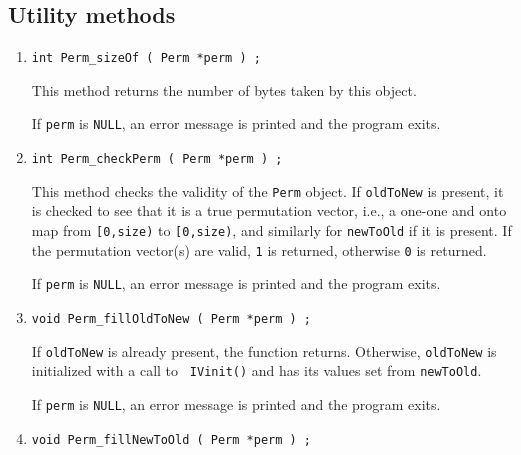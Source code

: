 \subsection{Utility methods}
\label{subsection:Perm:proto:utilities}
\par
\begin{enumerate}
\item
\begin{verbatim}
int Perm_sizeOf ( Perm *perm ) ;
\end{verbatim}
This method returns the number of bytes taken by this object.
\par {}
If {\tt perm} is {\tt NULL}, 
an error message is printed and the program exits.
\item
\begin{verbatim}
int Perm_checkPerm ( Perm *perm ) ;
\end{verbatim}
This method checks the validity of the {\tt Perm} object.
If {\tt oldToNew} is present, it is checked to see that
it is a true permutation vector, i.e., a one-one and onto map from
{\tt [0,size)} to {\tt [0,size)}, and similarly for {\tt newToOld}
if it is present.
If the permutation vector(s) are valid, {\tt 1} is returned,
otherwise {\tt 0} is returned.
\par {}
If {\tt perm} is {\tt NULL}, 
an error message is printed and the program exits.
\item
\begin{verbatim}
void Perm_fillOldToNew ( Perm *perm ) ;
\end{verbatim}
If {\tt oldToNew} is already present, the function returns.
Otherwise, {\tt oldToNew} is initialized with a call to {\tt
IVinit()} and has its values set from {\tt newToOld}.
\par {}
If {\tt perm} is {\tt NULL}, 
an error message is printed and the program exits.
\item
\begin{verbatim}
void Perm_fillNewToOld ( Perm *perm ) ;

\end{verbatim}
\end{enumerate}
